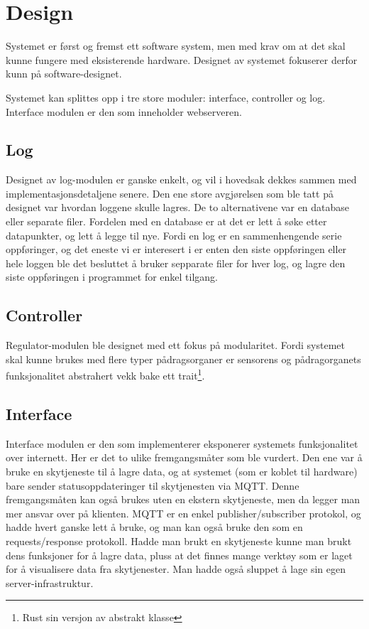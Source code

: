 \section{Design}

Systemet er først og fremst ett software system, men med krav om at det skal kunne fungere med eksisterende hardware. Designet av systemet fokuserer derfor kunn på software-designet.

Systemet kan splittes opp i tre store moduler: interface, controller og log. Interface modulen er den som inneholder webserveren. 

\subsection{Log}
Designet av log-modulen er ganske enkelt, og vil i hovedsak dekkes sammen med implementasjonsdetaljene senere. Den ene store avgjørelsen som ble tatt på designet var hvordan loggene skulle lagres. De to alternativene var en database eller separate filer.
Fordelen med en database er at det er lett å søke etter datapunkter, og lett å legge til nye. Fordi en log er en sammenhengende serie oppføringer, og det eneste vi er interesert i er enten den siste oppføringen eller hele loggen ble det besluttet å bruker sepparate filer for hver log, og lagre den siste oppføringen i programmet for enkel tilgang.

\subsection{Controller}
Regulator-modulen ble designet med ett fokus på modularitet. Fordi systemet skal kunne brukes med flere typer pådragsorganer er sensorens og pådragorganets funksjonalitet abstrahert vekk bake ett trait\footnote{Rust sin versjon av abstrakt klasse}.

\subsection{Interface}
Interface modulen er den som implementerer eksponerer systemets funksjonalitet over internett. Her er det to ulike fremgangsmåter som ble vurdert. Den ene var å bruke en skytjeneste til å lagre data, og at systemet (som er koblet til hardware) bare sender statusoppdateringer til skytjenesten via MQTT. Denne fremgangsmåten kan også brukes uten en ekstern skytjeneste, men da legger man mer ansvar over på klienten. MQTT er en enkel publisher/subscriber protokol, og hadde hvert ganske lett å bruke, og man kan også bruke den som en requests/response protokoll. Hadde man brukt en skytjeneste kunne man brukt dens funksjoner for å lagre data, pluss at det finnes mange verktøy som er laget for å visualisere data fra skytjenester. Man hadde også sluppet å lage sin egen server-infrastruktur.

